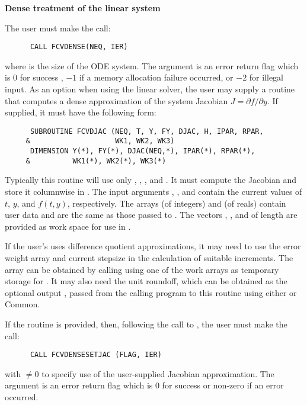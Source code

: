 \begin{Steps}

  {\s} {\bf Dense treatment of the linear system}
  
  The user must make the call:
\begin{verbatim}
      CALL FCVDENSE(NEQ, IER)
\end{verbatim}
  where  is the size of the ODE system.
  The argument  is an error return flag which is $0$ 
  for success , $-1$ if a memory allocation failure occurred, or $-2$ for illegal
  input.  
  As an option when using the {\dense} linear solver, the user may supply a
  routine that computes a dense approximation of the system Jacobian 
  $J = \partial f / \partial y$. If supplied, it must have the following form:
\begin{verbatim}
      SUBROUTINE FCVDJAC (NEQ, T, Y, FY, DJAC, H, IPAR, RPAR,
     &                    WK1, WK2, WK3)
      DIMENSION Y(*), FY(*), DJAC(NEQ,*), IPAR(*), RPAR(*),
     &          WK1(*), WK2(*), WK3(*)
\end{verbatim}
  Typically this routine will use only , , , and . 
  It must compute the Jacobian and store it columnwise in .
  The input arguments , , and  contain the current
  values of $t$, $y$, and $f(t,y)$, respectively.
  The arrays  (of integers) and  (of reals) contain user data
  and are the same as those passed to .
  The vectors , , and 
  of length  are provided as work space for use in .
  
  If the user's  uses difference quotient approximations, it
  may need to use the error weight array  and current stepsize 
  in the calculation of suitable increments.  The array  can be
  obtained by calling  using one of the work arrays as
  temporary storage for .  It may also need the unit roundoff,
  which can be obtained as the optional output , passed from
  the calling program to this routine using either  or Common.

  If the  routine is provided, then, 
  following the call to , the user must make the call:
\begin{verbatim}
      CALL FCVDENSESETJAC (FLAG, IER)
\end{verbatim}
  with  $\neq 0$ to specify use of the user-supplied Jacobian
  approximation.  The argument  is an error return flag which is $0$ 
  for success or non-zero if an error occurred.
  

\end{Steps}
